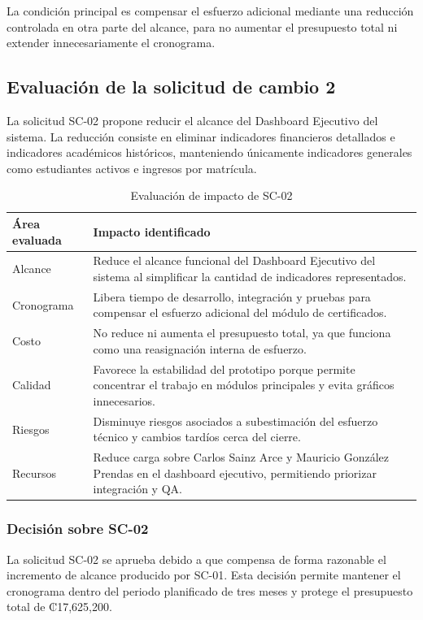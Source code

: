 \documentclass[11pt,spanish]{article}
\begin{document}
La condición principal es compensar el esfuerzo adicional mediante una reducción controlada en otra parte del alcance, para no aumentar el presupuesto total ni extender innecesariamente el cronograma.

\subsection{Evaluación de la solicitud de cambio 2}

La solicitud SC-02 propone reducir el alcance del Dashboard Ejecutivo del sistema. La reducción consiste en eliminar indicadores financieros detallados e indicadores académicos históricos, manteniendo únicamente indicadores generales como estudiantes activos e ingresos por matrícula.

\begin{table}[H]
\centering
\caption{Evaluación de impacto de SC-02}
\label{tab:evaluacion-sc02}
{\small
\begin{tabularx}{\textwidth}{p{3.2cm} Y}
\toprule
\textbf{Área evaluada} & \textbf{Impacto identificado} \\
\midrule
Alcance & Reduce el alcance funcional del Dashboard Ejecutivo del sistema al simplificar la cantidad de indicadores representados. \\
Cronograma & Libera tiempo de desarrollo, integración y pruebas para compensar el esfuerzo adicional del módulo de certificados. \\
Costo & No reduce ni aumenta el presupuesto total, ya que funciona como una reasignación interna de esfuerzo. \\
Calidad & Favorece la estabilidad del prototipo porque permite concentrar el trabajo en módulos principales y evita gráficos innecesarios. \\
Riesgos & Disminuye riesgos asociados a subestimación del esfuerzo técnico y cambios tardíos cerca del cierre. \\
Recursos & Reduce carga sobre Carlos Sainz Arce y Mauricio González Prendas en el dashboard ejecutivo, permitiendo priorizar integración y QA. \\
\bottomrule
\end{tabularx}
}
\end{table}

\subsubsection{Decisión sobre SC-02}

La solicitud SC-02 se aprueba debido a que compensa de forma razonable el incremento de alcance producido por SC-01. Esta decisión permite mantener el cronograma dentro del periodo planificado de tres meses y protege el presupuesto total de ₡17,625,200.
\end{document}
